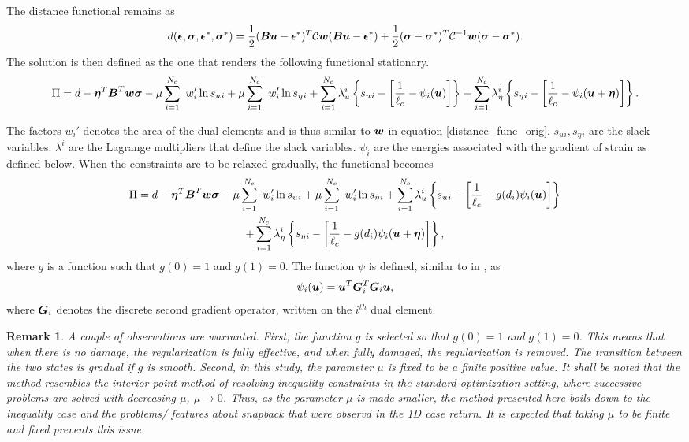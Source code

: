 \documentclass[10pt]{elsarticle}
\newtheorem*{remark}{Remark}
\begin{document}
The distance functional remains as
\begin{equation}
	d(\mbox{\boldmath $\epsilon$},\mbox{\boldmath $\sigma$},\mbox{\boldmath $\epsilon$}^*,\mbox{\boldmath $\sigma$}^*) = \frac{1}{2}(\mbox{\boldmath $B$} \mbox{\boldmath $u$} - \mbox{\boldmath $\epsilon$}^*)^T\mathcal{C}\mbox{\boldmath $w$}(\mbox{\boldmath $B$} \mbox{\boldmath $u$} - \mbox{\boldmath $\epsilon$}^*) + \frac{1}{2}(\mbox{\boldmath $\sigma$} - \mbox{\boldmath $\sigma$}^*)^T\mathcal{C}^{-1}\mbox{\boldmath $w$}(\mbox{\boldmath $\sigma$} - \mbox{\boldmath $\sigma$}^*).
\end{equation}
The solution is then defined as the one that renders the following functional stationary.
\begin{equation}
	\Pi  = d -\mbox{\boldmath $\eta$} ^T \mbox{\boldmath $B$}^T \mbox{\boldmath $w$} \mbox{\boldmath $\sigma$} - \mu \sum_{i=1}^{N_c} \
	w_i' \ln s_u{_i} + \mu \sum_{i=1}^{N_c} \
	w_i' \ln s_\eta{_i} +\sum_{i=1}^{N_c} \lambda_u^ i \left\{ s_u{_i}  - \left[ \frac{1}{\ell_c}- \psi_i(\mbox{\boldmath $u$}) \right]  \right\} 
	+\sum_{i=1}^{N_c} \lambda_\eta^ i \left\{ s_\eta{_i}  - \left[ \frac{1}{\ell_c}- \psi_i(\mbox{\boldmath $u$}+\mbox{\boldmath $\eta$}) \right]  \right\}.
\end{equation}

The factors $ w_i'$ denotes the area of the dual elements and is thus similar to $ \mbox{\boldmath $w$}$ in equation \ref{distance_func_orig}. $s_u{_i},s_\eta{_i}$ are the slack variables. $\lambda^i$ are the Lagrange multipliers that define the slack variables. $\psi_i$ are the energies associated with the gradient of strain as defined below. When the constraints are to be relaxed gradually, the functional becomes
\begin{multline}
	\Pi  = d -\mbox{\boldmath $\eta$} ^T \mbox{\boldmath $B$}^T \mbox{\boldmath $w$} \mbox{\boldmath $\sigma$} - \mu \sum_{i=1}^{N_c} \
	w_i' \ln s_u{_i} + \mu \sum_{i=1}^{N_c} \
	w_i' \ln s_\eta{_i} +\sum_{i=1}^{N_c} \lambda_u^ i \left\{ s_u{_i}  - \left[ \frac{1}{\ell_c}- g(d_i)\psi_i(\mbox{\boldmath $u$}) \right]  \right\} \\
	+\sum_{i=1}^{N_c} \lambda_\eta^ i \left\{ s_\eta{_i}  - \left[ \frac{1}{\ell_c}-g(d_i) \psi_i(\mbox{\boldmath $u$}+\mbox{\boldmath $\eta$}) \right]  \right\},
\end{multline}
where $g$ is a function such that $g(0)=1$ and $g(1)=0$. The function $\psi$ is defined, similar to in \cite{Mindlin1968}, as 
\begin{equation}
	\psi_i(\mbox{\boldmath $u$} ) = \mbox{\boldmath $u$} ^T \mbox{\boldmath $G$}_i ^T \mbox{\boldmath $G$}_i \mbox{\boldmath $u$},
\end{equation}
where $\mbox{\boldmath $G$}_i$ denotes the discrete second gradient operator, written on the $i^{th}$ dual element.

\begin{remark}
	A couple of observations are warranted. First, the function $g$ is selected so that $g(0)=1$ and $g(1)=0$. This means that when there is no damage, the regularization is fully effective, and when fully damaged, the regularization is removed. The transition between the two states is gradual if $g$ is smooth. Second, in this study, the parameter $\mu$ is fixed to be a finite positive value. It shall be noted that the method resembles the interior point method of resolving inequality constraints in the standard optimization setting, where successive problems are solved with decreasing $\mu$, $\mu \to 0$. Thus, as the parameter $\mu$ is made smaller, the method presented here boils down to the inequality case and the problems/ features about snapback that were observd in the 1D case return. It is expected that taking $\mu$ to be finite and fixed prevents this issue. 
\end{remark}
\end{document}

